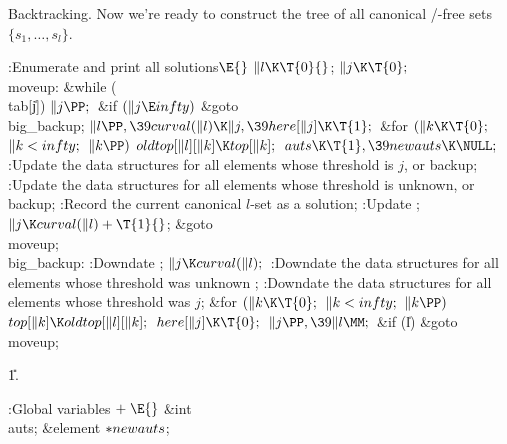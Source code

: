 Backtracking. Now we're ready to construct the tree of
all canonical
\SET/-free sets $\{s_1,\ldots,s_l\}$.

\Y\B\4:Enumerate and print all solutions\X${}\E{}$\6
$\|l\K\T{0}{}$;\5
${}\|j\K\T{0};{}$\6
\4\\{moveup}:\5
\&{while} (\\{tab}[\|j])\1\5
${}\|j\PP;{}$\2\6
\&{if} ${}(\|j\E\\{infty}){}$\1\5
\&{goto} \\{big\_backup};\2\6
${}\|l\PP,\39\\{curval}(\|l)\K\|j,\39\\{here}[\|j]\K\T{1};{}$\6
\&{for} ${}(\|k\K\T{0};{}$ ${}\|k<\\{infty};{}$ ${}\|k\PP){}$\1\5
${}\\{oldtop}[\|l][\|k]\K\\{top}[\|k];{}$\2\6
${}\\{auts}\K\T{1},\39\\{newauts}\K\NULL;{}$\6
:Update the data structures for all elements whose threshold is $j$, or
backup\X;\6
:Update the data structures for all elements whose threshold is unknown, or
backup\X;\6
:Record the current canonical $l$-set as a solution\X;\6
:Update \X;\6
${}\|j\K\\{curval}(\|l)+\T{1}{}$;\5
\&{goto} \\{moveup};\6
\4\\{big\_backup}:\5
:Downdate \X;\6
${}\|j\K\\{curval}(\|l);{}$\6
:Downdate the data structures for all elements whose threshold was unknown%
\X;\6
:Downdate the data structures for all elements whose threshold was $j$\X;\6
\&{for} ${}(\|k\K\T{0};{}$ ${}\|k<\\{infty};{}$ ${}\|k\PP){}$\1\5
${}\\{top}[\|k]\K\\{oldtop}[\|l][\|k];{}$\2\6
${}\\{here}[\|j]\K\T{0};{}$\6
${}\|j\PP,\39\|l\MM;{}$\6
\&{if} (\|l)\1\5
\&{goto} \\{moveup};\2\par
\U1.\fi

\B{}:Global variables\X${}\mathrel+\E{}$\6
\&{int} \\{auts};\6
\&{element} ${}{*}\\{newauts}{}$;\par
\fi

